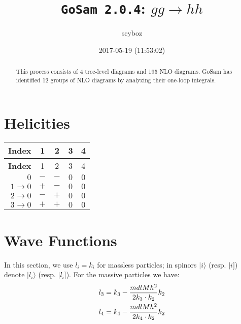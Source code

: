 \documentclass[a4paper]{article}
\title{\texttt{GoSam 2.0.4}: ${g}{g}\rightarrow{h}{h}$}
\author{scyboz}
\date{2017-05-19 (11:53:02)}
\newcommand{\kea}[1]{\vert #1 \rangle}
\newcommand{\keb}[1]{\vert #1 ]}
\begin{document}
\maketitle
\begin{abstract}
\noindent This process consists of 4 tree-level diagrams and 195 NLO diagrams. GoSam has identified 12 groups  of NLO diagrams by analyzing their one-loop integrals.
\end{abstract}
\newpage
\tableofcontents
\newpage

\section{Helicities}

\begin{longtable}[c]{r|cccc}
\bf{Index} &1&2&3&4\\
\hline
\endfirsthead
\bf{Index} &1&2&3&4\\
\hline
\endhead 
$0$& $-$& $-$& $0$& $0$\\
$1\rightarrow 0$& $+$& $-$& $0$& $0$\\
$2\rightarrow 0$& $-$& $+$& $0$& $0$\\
$3\rightarrow 0$& $+$& $+$& $0$& $0$\\
\end{longtable}
\section{Wave Functions}
In this section, we use $l_i=k_i$ for massless particles;
in spinors $\kea{i}$ (resp. $\keb{i}$) denote $\kea{l_i}$ (resp. $\keb{l_i}$).
For the massive particles we have:
\begin{align}
l_{3} &= k_{3} - \frac{mdlMh^2}{%
      2 k_{3}\cdot k_{2}}k_{2}\\
l_{4} &= k_{4} - \frac{mdlMh^2}{%
      2 k_{4}\cdot k_{2}}k_{2}
\end{align}
\end{document}
